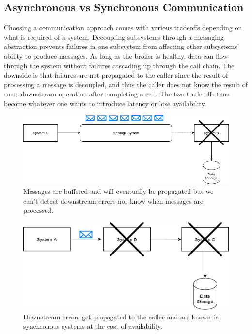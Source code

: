 \documentclass[11pt]{article}
\begin{document}
\subsection{Asynchronous vs Synchronous Communication}

Choosing a communication approach comes with various tradeoffs depending on what is required of a system. Decoupling subsystems through a messaging abstraction prevents failures in one subsystem from affecting other subsystems' ability to produce messages. As long as the broker is healthy, data can flow through the system without failures cascading up through the call chain.
\newline
\newline
The downside is that failures are not propagated to the caller since the result of processing a message is decoupled, and thus the caller does not know the result of some downstream operation after completing a call. The two trade offs thus become whatever one wants to introduce latency or lose availability.

\vspace{15pt}
\begin{figure}[htbp]
\centerline{\includegraphics[scale=0.5]{assets/buffered.png}}
\caption{ Messages are buffered and will eventually be propagated but we can't detect downstream errors nor know when messages are processed.}
\label{fig}
\end{figure}

\begin{figure}[htbp]
\centerline{\includegraphics[scale=0.5]{assets/sync.png}}
\caption{Downstream errors get propagated to the callee and are known in synchronous systems at the cost of availability.}
\label{fig}
\end{figure}
\vspace{15pt}
\end{document}
